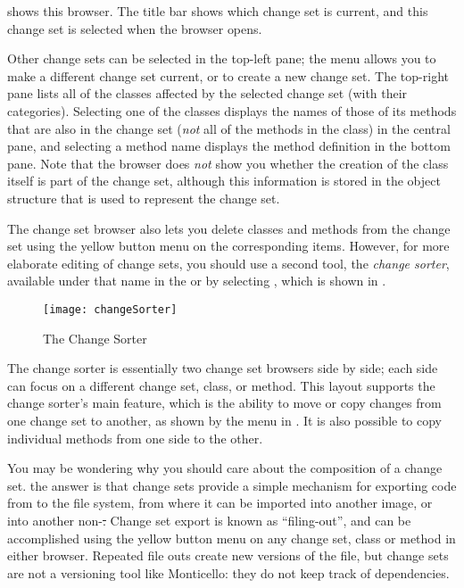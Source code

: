 \documentclass[a4paper,10pt,twoside]{book}
\begin{document}
 shows this browser.  The title bar shows which change set is current, and this change set is selected when the  browser opens. 

Other change sets can be selected in the top-left pane; the  menu allows you to make a different change set current, or to create a new change set.
The top-right pane lists all of the classes affected by the selected change set (with their categories).
Selecting one of the classes displays the names of those of its methods that are also in the change set (\emph{not} all of the methods in the class) in the central pane, and selecting a method name displays the method definition in the bottom pane.
Note that the browser does \emph{not} show you whether the creation of the class itself is part of the change set, although this information is stored in the object structure that is used to represent the change set.

The change set browser also lets you delete classes and methods from the change set using the yellow button menu on the corresponding items.  However, for more elaborate editing of change sets, you should use a second tool, the \textit{change sorter}, available under that name in the \toolsflap or by selecting , which is shown in .

\begin{figure}[btp]
	\begin{center}
		\texttt{[image: changeSorter]}
	\end{center}
	\caption{The Change Sorter}
	\label{fig:changeSorter}
\end{figure}

The change sorter is essentially two change set browsers side by side; each side can focus on a different change set, class, or method.
This layout supports the change sorter's main feature, which is the ability to move or copy changes from one change set to another, as shown by the  menu in .
It is also possible to copy individual methods from one side to the other.

You may be wondering why you should care about the composition of a change set.
the answer is that change sets provide a simple mechanism for exporting code from \sq to the file system, from where it can be imported into another \sq image, or into another non-\sq \st.
Change set export is known as ``filing-out'', and can be accomplished using the yellow button menu on any change set, class or method in either browser.
Repeated file outs create new versions of the file, but change sets are not a versioning tool like Monticello:
they do not keep track of dependencies.
\end{document}
